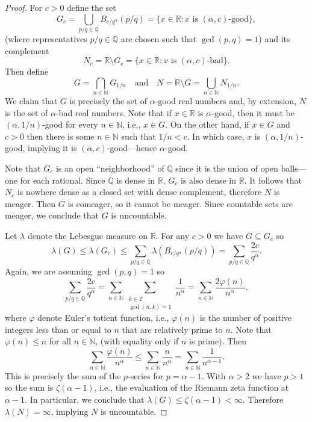 \documentclass[12pt]{article}
\theoremstyle{definition}
\newcommand{\isp}[1]{\quad\text{#1}\quad}
\newcommand{\N}{\mathbb{N}}
\newcommand{\Z}{\mathbb{Z}}
\newcommand{\Q}{\mathbb{Q}}
\newcommand{\R}{\mathbb{R}}
\renewcommand{\phi}{\varphi}
\newcommand{\<}{\langle}
\renewcommand{\>}{\rangle}
\begin{document}
\begin{proof}
    For $c > 0$ define the set
    \[
        G_c
            = \bigcup_{p/q \in \Q} B_{c/q^\alpha}(p/q)
            = \{x \in \R : x \text{ is $(\alpha, c)$-good}\},
    \]
    (where representatives $p/q \in \Q$ are chosen such that $\gcd(p, q) = 1$) and its complement
    \[
        N_c = \R \setminus G_c = \{x \in \R : x \text{ is $(\alpha, c)$-bad}\}.
    \]
    Then define
    \[
        G = \bigcap_{n \in \N} G_{1/n}
        \isp{and}
        N = \R \setminus G = \bigcup_{n \in \N} N_{1/n}.
    \]
    We claim that $G$ is precisely the set of $\alpha$-good real numbers and, by extension, $N$ is the set of $\alpha$-bad real numbers.
    Note that if $x \in \R$ is $\alpha$-good, then it must be $(\alpha, 1/n)$-good for every $n \in \N$, i.e., $x \in G$.
    On the other hand, if $x \in G$ and $c > 0$ then there is some $n \in \N$ such that $1/n < c$.
    In which case, $x$ is $(\alpha, 1/n)$-good, implying it is $(\alpha, c)$-good---hence $\alpha$-good.

    Note that $G_c$ is an open ``neighborhood'' of $\Q$ since it is the union of open balls---one for each rational.
    Since $\Q$ is dense in $\R$, $G_c$ is also dense in $\R$.
    It follows that $N_c$ is nowhere dense as a closed set with dense complement, therefore $N$ is meager.
    Then $G$ is comeager, so it cannot be meager.
    Since countable sets are meager, we conclude that $G$ is uncountable.

    Let $\lambda$ denote the Lebesgue measure on $\R$.
    For any $c > 0$ we have $G \subseteq G_c$ so
    \[
        \lambda(G)
            \leq \lambda(G_c)
            \leq \sum_{p/q \in \Q} \lambda(B_{c/q^\alpha}(p/q))
            = \sum_{p/q \in \Q} \frac{2c}{q^\alpha}.
    \]
    Again, we are assuming $\gcd(p, q) = 1$ so
    \[
        \sum_{p/q \in \Q} \frac{2c}{q^\alpha}
            = \sum_{n \in \N} \sum_{\substack{k \in \Z \\ \gcd(n, k) = 1}} \frac{1}{n^\alpha}
            = \sum_{n \in \N} \frac{2 \phi(n)}{n^\alpha},
    \]
    where $\phi$ denote Euler's totient function, i.e., $\phi(n)$ is the number of positive integers less than or equal to $n$ that are relatively prime to $n$.
    Note that $\phi(n) \leq n$ for all $n \in \N$, (with equality only if $n$ is prime).
    Then
    \[
        \sum_{n \in \N} \frac{\phi(n)}{n^\alpha}
            \leq \sum_{n \in \N} \frac{n}{n^\alpha} 
            = \sum_{n \in \N} \frac{1}{n^{\alpha-1}}.
    \]
    This is precisely the sum of the $p$-series for $p = \alpha - 1$.
    With $\alpha > 2$ we have $p > 1$ so the sum is $\zeta(\alpha - 1)$, i.e., the evaluation of the Riemann zeta function at $\alpha - 1$.
    In particular, we conclude that $\lambda(G) \leq \zeta(\alpha - 1) < \infty$.
    Therefore $\lambda(N) = \infty$, implying $N$ is uncountable.
\end{proof}
\end{document}
